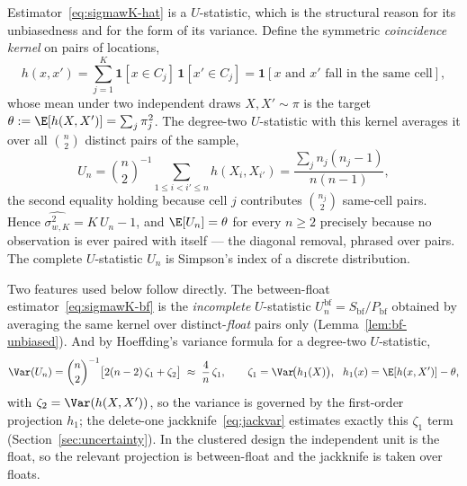 \begin{remark}
\label{rem:ustat}
Estimator~\eqref{eq:sigmawK-hat} is a $U$-statistic, which is the
structural reason for its unbiasedness and for the form of its variance.
Define the symmetric \emph{coincidence kernel} on pairs of locations,
\[
  h(x,x')=\sum_{j=1}^{K}\mathbf 1[x\in C_j]\,\mathbf 1[x'\in C_j]
         =\mathbf 1[\text{$x$ and $x'$ fall in the same cell}],
\]
whose mean under two independent draws $X,X'\sim\pi$ is the target
$\theta:=\E[h(X,X')]=\sum_j\pi_j^2$. The degree-two $U$-statistic with
this kernel averages it over all $\binom{n}{2}$ distinct pairs of the
sample,
\begin{equation}
  U_n=\binom{n}{2}^{-1}\sum_{1\le i<i'\le n} h(X_i,X_{i'})
     =\frac{\sum_j n_j(n_j-1)}{n(n-1)},
  \label{eq:ustat}
\end{equation}
the second equality holding because cell $j$ contributes
$\binom{n_j}{2}$ same-cell pairs. Hence
$\widehat{\sigma_{w,K}^2}=K\,U_n-1$, and $\E[U_n]=\theta$ for every
$n\ge 2$ precisely because no observation is ever paired with itself
--- the diagonal removal, phrased over pairs. The complete $U$-statistic
$U_n$ is Simpson's index of a discrete distribution.

Two features used below follow directly. The between-float
estimator~\eqref{eq:sigmawK-bf} is the \emph{incomplete} $U$-statistic
$U_n^{\mathrm{bf}}=S_{\mathrm{bf}}/P_{\mathrm{bf}}$ obtained by averaging
the same kernel over distinct-\emph{float} pairs only
(Lemma~\ref{lem:bf-unbiased}). And by Hoeffding's variance formula for a
degree-two $U$-statistic,
\[
  \Var(U_n)=\binom{n}{2}^{-1}\big[2(n-2)\,\zeta_1+\zeta_2\big]
  \;\approx\;\frac{4}{n}\,\zeta_1,\qquad
  \zeta_1=\Var\!\big(h_1(X)\big),\ \ h_1(x)=\E[h(x,X')]-\theta,
\]
with $\zeta_2=\Var(h(X,X'))$, so the variance is governed by the
first-order projection $h_1$; the delete-one jackknife~\eqref{eq:jackvar}
estimates exactly this $\zeta_1$ term (Section~\ref{sec:uncertainty}). In
the clustered design the independent unit is the float, so the relevant
projection is between-float and the jackknife is taken over floats.
\end{remark}

